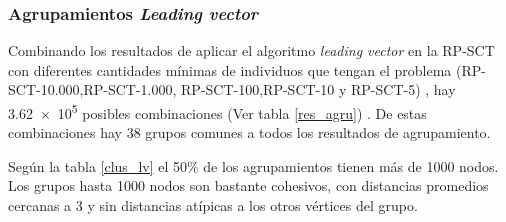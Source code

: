 \subsubsection{Agrupamientos \textit{Leading vector}}
Combinando los resultados de aplicar el algoritmo \textit{leading vector} en la \acrshort{RP-SCT} con diferentes cantidades mínimas de individuos que tengan el problema (RP-SCT-10.000,RP-SCT-1.000, RP-SCT-100,RP-SCT-10 y RP-SCT-5) , hay \num{3.62e5}  posibles combinaciones (Ver tabla \ref{res_agru}) .  De estas combinaciones hay 38 grupos comunes a todos los resultados de agrupamiento. 

Según la tabla \ref{clus_lv} el 50\% de los agrupamientos tienen más de 1000 nodos. Los grupos hasta 1000 nodos  son bastante cohesivos, con distancias promedios cercanas a 3 y sin distancias atípicas a los otros vértices del grupo. 

\begin{table}[htb]
\centering
\caption{Agrupamientos recurrentes en la red \acrshort{RP-SCT} con el algoritmo \textit{Leading vector}}
\label{clus_lv}
\end{table}

